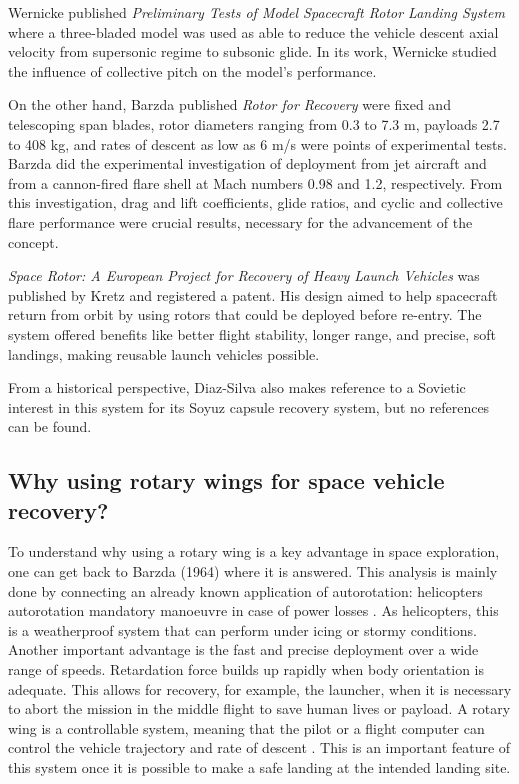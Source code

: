 Wernicke published \textit{Preliminary Tests of Model Spacecraft Rotor Landing System} \cite{wernicke_preliminary_1959} where a three-bladed model was used as able to reduce the vehicle descent axial velocity from supersonic regime to subsonic glide. In its work, Wernicke studied the influence of collective pitch on the model's performance.

On the other hand, Barzda published \textit{Rotor for Recovery} \cite{barzda_rotors_1964} were fixed and telescoping span blades, rotor diameters ranging from 0.3 to 7.3 \unit{m}, payloads 2.7 to 408 \unit{kg}, and rates of descent as low as 6 \unit{m/s} were points of experimental tests. Barzda did the experimental investigation of deployment from jet aircraft and from a cannon-fired flare shell at  Mach numbers 0.98 and 1.2, respectively. From this investigation, drag and lift coefficients, glide ratios, and cyclic and collective flare performance were crucial results, necessary for the advancement of the concept.

\textit{Space Rotor: A European Project for Recovery of Heavy Launch Vehicles} \cite{kretz_space_1966} was published by Kretz and registered a patent. His design aimed to help spacecraft return from orbit by using rotors that could be deployed before re-entry. The system offered benefits like better flight stability, longer range, and precise, soft landings, making reusable launch vehicles possible.

From a historical perspective, Diaz-Silva \cite{diaz-silva_rotary_2013} also makes reference to a Sovietic interest in this system for its Soyuz capsule recovery system, but no references can be found.


\subsection{Why using rotary wings for space vehicle recovery?}

To understand why using a rotary wing is a key advantage in space exploration, one can get back to Barzda (1964) \cite{barzda_rotors_1964} where it is answered. This analysis is mainly done by connecting an already known application of autorotation: helicopters autorotation mandatory manoeuvre in case of power losses \cite{federal_aviation_administration_helicopter_2021}. As helicopters, this is a weatherproof system that can perform under icing or stormy conditions. Another important advantage is the fast and precise deployment over a wide range of speeds. Retardation force builds up rapidly when body orientation is adequate. This allows for recovery, for example, the launcher, when it is necessary to abort the mission in the middle flight to save human lives or payload. A rotary wing is a controllable system, meaning that the pilot or a flight computer can control the vehicle trajectory and rate of descent \cite{federal_aviation_administration_helicopter_2021}. This is an important feature of this system once it is possible to make a safe landing at the intended landing site.

